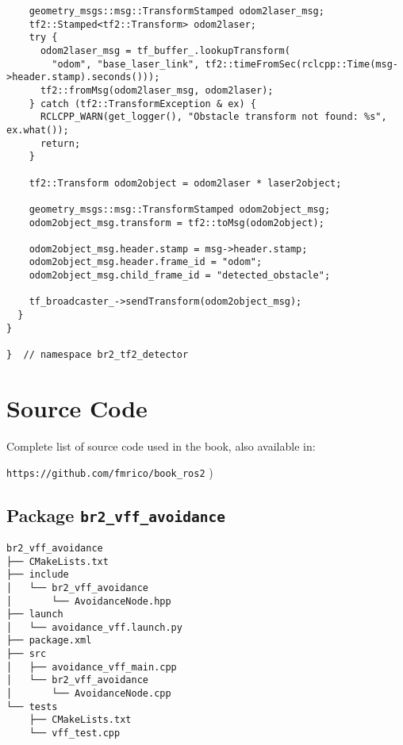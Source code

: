 \begin{tcolorbox}[sharp corners, colframe=gray!80, colback=LightGray, left=0pt, top=0pt, bottom=0pt, title=\texttt{br2\_tf2\_detector/src/br2\_tf2\_detector/ObstacleDetectorImprovedNode.cpp}]
\begin{verbatim}
    geometry_msgs::msg::TransformStamped odom2laser_msg;
    tf2::Stamped<tf2::Transform> odom2laser;
    try {
      odom2laser_msg = tf_buffer_.lookupTransform(
        "odom", "base_laser_link", tf2::timeFromSec(rclcpp::Time(msg->header.stamp).seconds()));
      tf2::fromMsg(odom2laser_msg, odom2laser);
    } catch (tf2::TransformException & ex) {
      RCLCPP_WARN(get_logger(), "Obstacle transform not found: %s", ex.what());
      return;
    }

    tf2::Transform odom2object = odom2laser * laser2object;

    geometry_msgs::msg::TransformStamped odom2object_msg;
    odom2object_msg.transform = tf2::toMsg(odom2object);

    odom2object_msg.header.stamp = msg->header.stamp;
    odom2object_msg.header.frame_id = "odom";
    odom2object_msg.child_frame_id = "detected_obstacle";

    tf_broadcaster_->sendTransform(odom2object_msg);
  }
}

}  // namespace br2_tf2_detector
    \end{verbatim}
    \end{tcolorbox}
  \normalsize



\appendix

\chapter[Source Code]{Source Code}
\label{cap:source}
Complete list of source code used in the book, also available in:

\vspace{0.5cm}
\large
\texttt{https://github.com/fmrico/book\_ros2}
\normalsize
)
\section{Package \texttt{br2\_vff\_avoidance}}
\label{sec:anex:br2_vff_avoidance}

 \footnotesize
\begin{tcolorbox}[sharp corners, colframe=gray!80, colback=LightGray, left=0pt, top=0pt, bottom=0pt, title=Package \texttt{br2\_vff\_avoidance}]
  \begin{verbatim}
br2_vff_avoidance
├── CMakeLists.txt
├── include
│   └── br2_vff_avoidance
│       └── AvoidanceNode.hpp
├── launch
│   └── avoidance_vff.launch.py
├── package.xml
├── src
│   ├── avoidance_vff_main.cpp
│   └── br2_vff_avoidance
│       └── AvoidanceNode.cpp
└── tests
    ├── CMakeLists.txt
    └── vff_test.cpp    \end{verbatim}
    \end{tcolorbox}
  \normalsize

